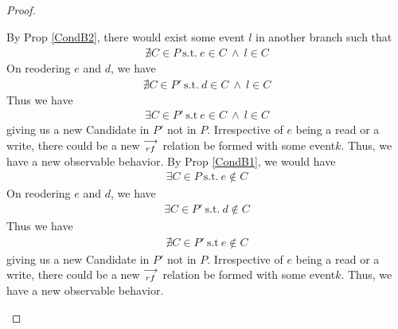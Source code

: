 \begin{proof}
\begin{itemize}
                By Prop \ref{CondB2}, there would exist some event $l$ in another branch such that 
                \begin{align*}
                    \nexists C \in P \ \text{s.t.} \ e \in C \ \wedge \ l \in C 
                \end{align*}
                On reodering $e$ and $d$, we have 
                \begin{align*}
                    \nexists C \in P' \ \text{s.t.} \ d \in C \ \wedge \ l \in C 
                \end{align*}
                Thus we have 
                \begin{align*}
                    \exists C \in P' \ \text{s.t} \ e \in C \ \wedge \ l \in C
                \end{align*}
                giving us a new Candidate in $P'$ not in $P$. 
                Irrespective of $e$ being a read or a write, there could be a new $\stackrel{\longrightarrow}{_{rf}}$ relation be formed with some event$k$. Thus, we have a new observable behavior. 
                By Prop \ref{CondB1}, we would have 
                \begin{align*}
                    \exists C \in P \ \text{s.t.} \ e \notin C  
                \end{align*}
                On reodering $e$ and $d$, we have 
                \begin{align*}
                    \exists C \in P' \ \text{s.t.} \ d \notin C  
                \end{align*}
                Thus we have 
                \begin{align*}
                    \nexists C \in P' \ \text{s.t} \ e \notin C 
                \end{align*}
                giving us a new Candidate in $P'$ not in $P$.
                Irrespective of $e$ being a read or a write, there could be a new $\stackrel{\longrightarrow}{_{rf}}$ relation be formed with some event$k$. Thus, we have a new observable behavior. 
                
        \end{itemize}


\end{proof}
